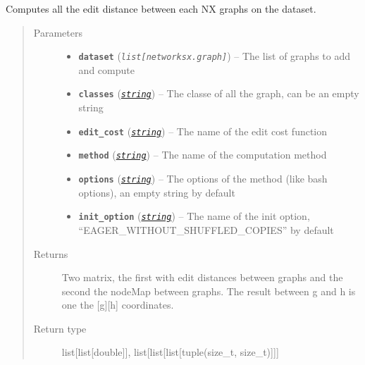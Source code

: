 \documentclass[letterpaper,10pt,english]{sphinxmanual}
\begin{document}

\begin{fulllineitems}
\label{doc:gedlibpy.compute_edit_distance_on_nx_graphs}
Computes all the edit distance between each NX graphs on the dataset.
\begin{quote}\begin{description}
\item[{Parameters}] \leavevmode\begin{itemize}
\item {} 
\textbf{\texttt{dataset}} (\emph{\texttt{list{[}networksx.graph{]}}}) -- The list of graphs to add and compute

\item {} 
\textbf{\texttt{classes}} (\href{https://docs.python.org/3/library/string.html\#module-string}{\emph{\texttt{string}}}) -- The classe of all the graph, can be an empty string

\item {} 
\textbf{\texttt{edit\_cost}} (\href{https://docs.python.org/3/library/string.html\#module-string}{\emph{\texttt{string}}}) -- The name of the edit cost function

\item {} 
\textbf{\texttt{method}} (\href{https://docs.python.org/3/library/string.html\#module-string}{\emph{\texttt{string}}}) -- The name of the computation method

\item {} 
\textbf{\texttt{options}} (\href{https://docs.python.org/3/library/string.html\#module-string}{\emph{\texttt{string}}}) -- The options of the method (like bash options), an empty string by default

\item {} 
\textbf{\texttt{init\_option}} (\href{https://docs.python.org/3/library/string.html\#module-string}{\emph{\texttt{string}}}) -- The name of the init option, ``EAGER\_WITHOUT\_SHUFFLED\_COPIES'' by default

\end{itemize}

\item[{Returns}] \leavevmode
Two matrix, the first with edit distances between graphs and the second the nodeMap between graphs. The result between g and h is one the {[}g{]}{[}h{]} coordinates.

\item[{Return type}] \leavevmode
list{[}list{[}double{]}{]}, list{[}list{[}list{[}tuple(size\_t, size\_t){]}{]}{]}


\end{description}
\end{quote}
\end{fulllineitems}
\end{document}
